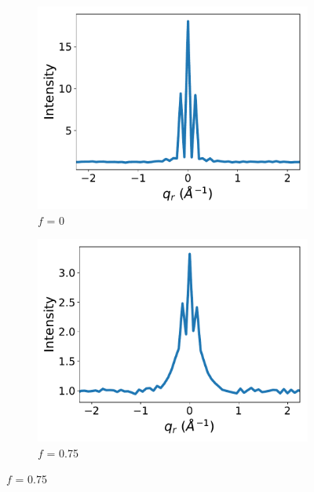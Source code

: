 \documentclass[journal=jpcbfk,manuscript=article]{achemso}
\begin{document}
  \begin{figure}
  \centering
  \begin{subfigure}{0.325\textwidth}
  \includegraphics[width=\textwidth]{sf_qy_sr0.pdf}
  \caption{$f$ = 0}\label{fig:sf_qy_sr0}
  \end{subfigure}
  \begin{subfigure}{0.325\textwidth}
  \includegraphics[width=\textwidth]{sf_qy_sr75.pdf}
  \caption{$f$ = 0.75}\label{fig:sf_qy_sr75}
  \end{subfigure}

\end{figure}
\end{document}
